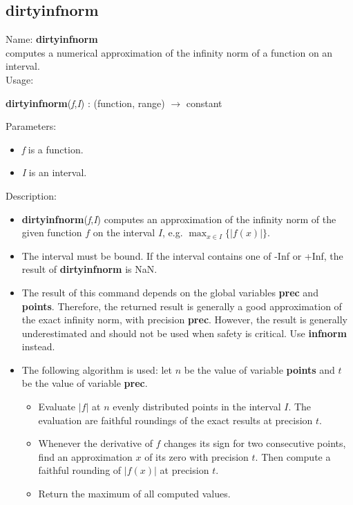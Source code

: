 \subsection{dirtyinfnorm}
\label{labdirtyinfnorm}
\noindent Name: \textbf{dirtyinfnorm}\\
computes a numerical approximation of the infinity norm of a function on an interval.\\
\noindent Usage: 
\begin{center}
\textbf{dirtyinfnorm}(\emph{f},\emph{I}) : (\textsf{function}, \textsf{range}) $\rightarrow$ \textsf{constant}
\end{center}
Parameters: 
\begin{itemize}
\item \emph{f} is a function.
\item \emph{I} is an interval.
\end{itemize}
\noindent Description: \begin{itemize}

\item \textbf{dirtyinfnorm}(\emph{f},\emph{I}) computes an approximation of the infinity norm of the 
   given function $f$ on the interval $I$, e.g. $\max_{x \in I} \{|f(x)|\}$.

\item The interval must be bound. If the interval contains one of -Inf or +Inf, the 
   result of \textbf{dirtyinfnorm} is NaN.

\item The result of this command depends on the global variables \textbf{prec} and \textbf{points}.
   Therefore, the returned result is generally a good approximation of the exact
   infinity norm, with precision \textbf{prec}. However, the result is generally 
   underestimated and should not be used when safety is critical.
   Use \textbf{infnorm} instead.

\item The following algorithm is used: let $n$ be the value of variable \textbf{points}
   and $t$ be the value of variable \textbf{prec}.
   \begin{itemize}
   \item Evaluate $|f|$ at $n$ evenly distributed points in the
     interval $I$. The evaluation are faithful roundings of the exact
     results at precision $t$.
   \item Whenever the derivative of $f$ changes its sign for two consecutive 
     points, find an approximation $x$ of its zero with precision $t$.
     Then compute a faithful rounding of $|f(x)|$ at precision $t$.
   \item Return the maximum of all computed values.
   \end{itemize}
\end{itemize}
